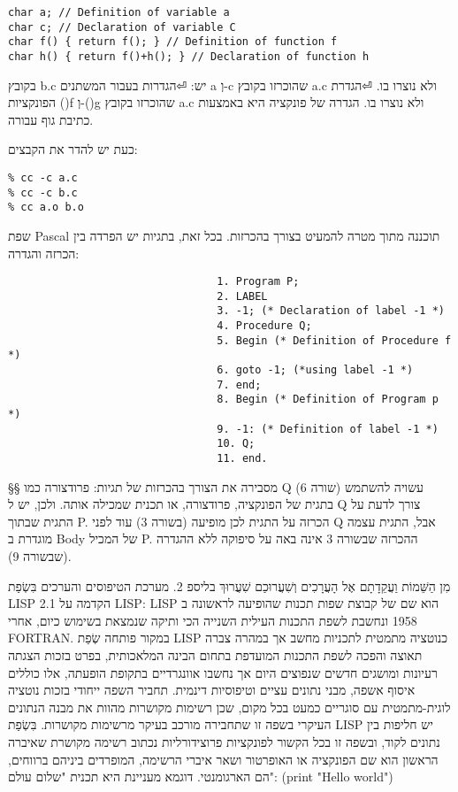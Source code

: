 \begin{טבלא}[!htbp]
\begin{verbatim}
char a; // Definition of variable a
char c; // Declaration of variable C
char f() { return f(); } // Definition of function f
char h() { return f()+h(); } // Declaration of function h
\end{verbatim}
      בקובץ b.c יש:
⏎הגדרות בעבור המשתנים a וְ-c שהוכרזו בקובץ a.c ולא נוצרו בו.
⏎הגדרת הפונקציות ()f וְ-()g שהוכרזו בקובץ a.c ולא נוצרו בו. הגדרה של פונקציה היא באמצעות כתיבת גוף עבורה.

      כעת יש להדר את הקבצים:
\begin{verbatim}
% cc -c a.c
% cc -c b.c
% cc a.o b.o
\end{verbatim}
      שפת Pascal תוכננה מתוך מטרה להמעיט בצורך בהכרזות. בכל זאת, בתגיות יש הפרדה בין הכרזה והגדרה:
\begin{verbatim}
                                 1. Program P;
                                 2. LABEL
                                 3. -1; (* Declaration of label -1 *)
                                 4. Procedure Q;
                                 5. Begin (* Definition of Procedure f *)
                                 6. goto -1; (*using label -1 *)
                                 7. end;
                                 8. Begin (* Definition of Program p *)
                                 9. -1: (* Definition of label -1 *)
                                 10. Q;
                                 11. end.
\end{verbatim}
      §§ מסבירה את הצורך בהכרזות של תגיות: פרודצורה כמו Q עשויה להשתמש (שורה 6) בתגית של הפונקציה, פרודצורה, או תכנית שמכילה אותה. ולכן, יש ל Q צורך לדעת על התגית שבתוך P.
      הכרזה על התגית לכן מופיעה (בשורה 3) עוד לפני Q אבל, התגית עצמה מוגדרת ב Body של המכיל P. ההכרזה שבשורה 3 אינה באה על סיפוקה ללא ההגדרה (שבשורה 9).

      מִן הַשֵּׁמוֹת וַעֲקֵדָתָם אֶל הָעֲרָכִים וְשִׁעֲרוּכַם
      שִׁעֲרוּךְ בליספ
      2. מערכת הטיפוסים והערכים בִּשְׂפַת LISP
      2.1 הקדמה על LISP:
      LISP הוא שם של קבוצת שפות תכנות שהופיעה לראשונה ב 1958 ונחשבת לשפת התכנות
      העילית השנייה הכי ותיקה שנמצאת בשימוש כיום, אחרי FORTRAN. במקור פותחה שְׂפַת LISP
      כנוטציה מתמטית לתכניות מחשב אך במהרה צברה תאוצה והפכה לשפת התכנות המועדפת בתחום
      הבינה המלאכותית, בפרט בזכות הצגתה רעיונות ומושגים חדשים שנפוצים היום אך נחשבו
      אוונגרדיים בתקופת הופעתה, אלו כוללים איסוף אשפה, מבני נתונים עציים וטיפוסיות
      דינמית. תחביר השפה ייחודי בזכות נוטציה לוגית-מתמטית עם סוגריים כמעט בכל מקום,
      שכן רשימות מקושרות מהוות את מבנה הנתונים העיקרי בשפה זו שתחבירה מורכב בעיקר
      מרשימות מקושרות. בִּשְׂפַת LISP יש חליפות בין נתונים לקוד, ובשפה זו בכל הקשור
      לפונקציות פרוצידורליות נכתוב רשימה מקושרת שאיברה הראשון הוא שם הפונקציה או
      האופרטור ושאר איברי הרשימה, המופרדים ביניהם ברווחים, הם הארגומנטי. דוגמא
      מעניינת היא תכנית "שלום עולם":
      (print "Hello world")


\end{טבלא}
